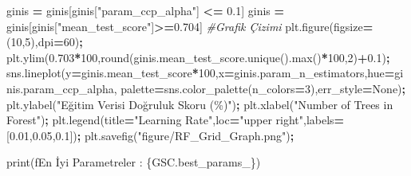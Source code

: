 \documentclass[12pt,twoside]{deuthesis}
\newenvironment{Shaded}{\begin{snugshade}}{\end{snugshade}}
\newcommand{\BuiltInTok}[1]{#1}
\newcommand{\CommentTok}[1]{\textcolor[rgb]{0.56,0.35,0.01}{\textit{#1}}}
\newcommand{\DecValTok}[1]{\textcolor[rgb]{0.00,0.00,0.81}{#1}}
\newcommand{\FloatTok}[1]{\textcolor[rgb]{0.00,0.00,0.81}{#1}}
\newcommand{\NormalTok}[1]{#1}
\newcommand{\OperatorTok}[1]{\textcolor[rgb]{0.81,0.36,0.00}{\textbf{#1}}}
\newcommand{\SpecialCharTok}[1]{\textcolor[rgb]{0.00,0.00,0.00}{#1}}
\newcommand{\SpecialStringTok}[1]{\textcolor[rgb]{0.31,0.60,0.02}{#1}}
\newcommand{\StringTok}[1]{\textcolor[rgb]{0.31,0.60,0.02}{#1}}
\newcommand{\VariableTok}[1]{\textcolor[rgb]{0.00,0.00,0.00}{#1}}
\begin{document}
\begin{Shaded}
\begin{Highlighting}[]
\NormalTok{ginis }\OperatorTok{=}\NormalTok{ ginis[ginis[}\StringTok{"param\_ccp\_alpha"}\NormalTok{] }\OperatorTok{\textless{}=} \FloatTok{0.1}\NormalTok{]}
\NormalTok{ginis }\OperatorTok{=}\NormalTok{ ginis[ginis[}\StringTok{"mean\_test\_score"}\NormalTok{]}\OperatorTok{\textgreater{}=}\FloatTok{0.704}\NormalTok{]}
\CommentTok{\#Grafik Çizimi}
\NormalTok{plt.figure(figsize}\OperatorTok{=}\NormalTok{(}\DecValTok{10}\NormalTok{,}\DecValTok{5}\NormalTok{),dpi}\OperatorTok{=}\DecValTok{60}\NormalTok{)}\OperatorTok{;}
\NormalTok{plt.ylim(}\FloatTok{0.703}\OperatorTok{*}\DecValTok{100}\NormalTok{,}\BuiltInTok{round}\NormalTok{(ginis.mean\_test\_score.unique().}\BuiltInTok{max}\NormalTok{()}\OperatorTok{*}\DecValTok{100}\NormalTok{,}\DecValTok{2}\NormalTok{)}\OperatorTok{+}\FloatTok{0.1}\NormalTok{)}\OperatorTok{;}
\NormalTok{sns.lineplot(y}\OperatorTok{=}\NormalTok{ginis.mean\_test\_score}\OperatorTok{*}\DecValTok{100}\NormalTok{,x}\OperatorTok{=}\NormalTok{ginis.param\_n\_estimators,hue}\OperatorTok{=}\NormalTok{ginis.param\_ccp\_alpha,}
\NormalTok{palette}\OperatorTok{=}\NormalTok{sns.color\_palette(n\_colors}\OperatorTok{=}\DecValTok{3}\NormalTok{),err\_style}\OperatorTok{=}\VariableTok{None}\NormalTok{)}\OperatorTok{;}
\NormalTok{plt.ylabel(}\StringTok{"Eğitim Verisi Doğruluk Skoru (\%)"}\NormalTok{)}\OperatorTok{;}
\NormalTok{plt.xlabel(}\StringTok{"Number of Trees in Forest"}\NormalTok{)}\OperatorTok{;}
\NormalTok{plt.legend(title}\OperatorTok{=}\StringTok{"Learning Rate"}\NormalTok{,loc}\OperatorTok{=}\StringTok{"upper right"}\NormalTok{,labels}\OperatorTok{=}\NormalTok{[}\FloatTok{0.01}\NormalTok{,}\FloatTok{0.05}\NormalTok{,}\FloatTok{0.1}\NormalTok{])}\OperatorTok{;}
\NormalTok{plt.savefig(}\StringTok{"figure/RF\_Grid\_Graph.png"}\NormalTok{)}\OperatorTok{;}
\end{Highlighting}
\end{Shaded}
\begin{Shaded}
\begin{Highlighting}[]
\BuiltInTok{print}\NormalTok{(}\SpecialStringTok{f\textquotesingle{}En İyi Parametreler : }\SpecialCharTok{\{}\NormalTok{GSC}\SpecialCharTok{.}\NormalTok{best\_params\_}\SpecialCharTok{\}}\SpecialStringTok{\textquotesingle{}}\NormalTok{)}
\end{Highlighting}
\end{Shaded}
\end{document}
